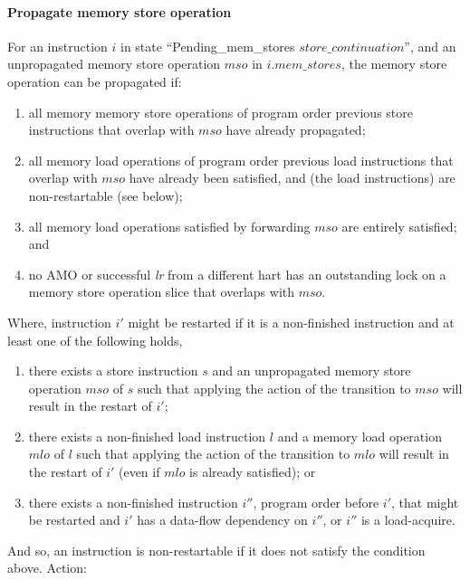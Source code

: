 \paragraph{Propagate memory store operation}\label{omm:prop_store}
For an instruction $i$ in state ``{\sc Pending\_mem\_stores} $store\_continuation$'', and an unpropagated memory store operation $mso$ in $i.mem\_stores$, the memory store operation can be propagated if:
\begin{enumerate}
\item all memory memory store operations of program order previous store instructions that overlap with $mso$ have already propagated;
\item all memory load operations of program order previous load instructions that overlap with $mso$ have already been satisfied, and (the load instructions) are non-restartable (see below);
\item all memory load operations satisfied by forwarding $mso$ are entirely satisfied; and
\item no AMO or successful {\em lr} from a different hart has an outstanding lock on a memory store operation slice that overlaps with $mso$.
\end{enumerate}
Where, instruction $i'$ might be restarted if it is a non-finished instruction and at least one of the following holds,
\begin{enumerate}
\item there exists a store instruction $s$ and an unpropagated memory store operation $mso$ of $s$ such that applying the action of the  transition to $mso$ will result in the restart of $i'$;
\item there exists a non-finished load instruction $l$ and a memory load operation $mlo$ of $l$ such that applying the action of the  transition to $mlo$ will result in the restart of $i'$ (even if $mlo$ is already satisfied); or
\item there exists a non-finished instruction $i''$, program order before $i'$, that might be restarted and $i'$ has a data-flow dependency on $i''$, or $i''$ is a load-acquire.
\end{enumerate}
And so, an instruction is non-restartable if it does not satisfy the condition above.
Action:

